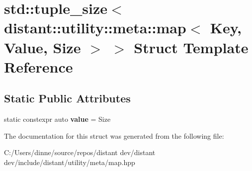 \hypertarget{structstd_1_1tuple__size_3_01distant_1_1utility_1_1meta_1_1map_3_01_key_00_01_value_00_01_size_01_4_01_4}{}\section{std\+:\+:tuple\+\_\+size$<$ distant\+:\+:utility\+:\+:meta\+:\+:map$<$ Key, Value, Size $>$ $>$ Struct Template Reference}
\label{structstd_1_1tuple__size_3_01distant_1_1utility_1_1meta_1_1map_3_01_key_00_01_value_00_01_size_01_4_01_4}
\subsection*{Static Public Attributes}
\begin{DoxyCompactItemize}
\item 
\mbox{\label{structstd_1_1tuple__size_3_01distant_1_1utility_1_1meta_1_1map_3_01_key_00_01_value_00_01_size_01_4_01_4_a341d096836568e90d3a65d0c623dadb5}} 
static constexpr auto {\bfseries value} = Size
\end{DoxyCompactItemize}


The documentation for this struct was generated from the following file\+:\begin{DoxyCompactItemize}
\item 
C\+:/\+Users/dinne/source/repos/distant dev/distant dev/include/distant/utility/meta/map.\+hpp\end{DoxyCompactItemize}
